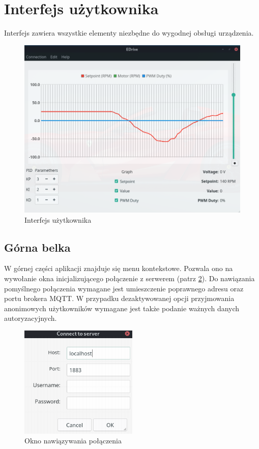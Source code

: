\section{Interfejs użytkownika}
    Interfejs zawiera wszystkie elementy niezbędne do wygodnej obsługi urządzenia.
    
    \begin{figure}[ht]
        \centering
        \includegraphics[width=1\textwidth]{img/app_ui.png}
        \caption{Interfejs użytkownika}
        \label{fig:app_ui}
    \end{figure}
    
    
    \subsection{Górna belka}
        W górnej części aplikacji znajduje się menu kontekstowe. Pozwala ono na wywołanie okna inicjalizującego połączenie z serwerem (patrz \ref{fig:app_connect}). Do nawiązania pomyślnego połączenia wymagane jest umieszczenie poprawnego adresu oraz portu brokera MQTT. W przypadku dezaktywowanej opcji przyjmowania anonimowych użytkowników wymagane jest także podanie ważnych danych autoryzacyjnych.
        
        \begin{figure}[ht]
            \centering
            \includegraphics[width=0.5\textwidth]{img/app_connect.png}
            \caption{Okno nawiązywania połączenia}
            \label{fig:app_connect}
        \end{figure}
    
